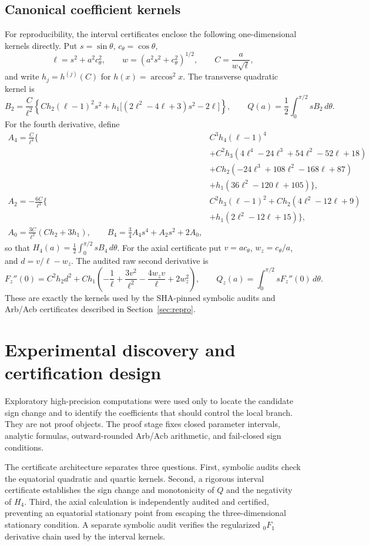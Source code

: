\documentclass[11pt]{article}
\begin{document}
\subsection{Canonical coefficient kernels}
For reproducibility, the interval certificates enclose the following one-dimensional kernels directly. Put $s=\sin\theta$, $c_\theta=\cos\theta$,
\[
\ell=s^2+a^2c_\theta^2,\qquad w=(a^2s^2+c_\theta^2)^{1/2},\qquad C=\frac{a}{w\sqrt\ell},
\]
and write $h_j=h^{(j)}(C)$ for $h(x)=\arccos^2x$. The transverse quadratic kernel is
\[
B_2=\frac{C}{\ell^2}\!\left\{Ch_2(\ell-1)^2s^2+h_1\big[(2\ell^2-4\ell+3)s^2-2\ell\big]\right\},
\qquad Q(a)=\frac12\int_0^{\pi/2}sB_2\,d\theta.
\]
For the fourth derivative, define
\begin{align*}
A_4=\frac{C}{\ell^4}\{&C^3h_4(\ell-1)^4\\
&+C^2h_3(4\ell^4-24\ell^3+54\ell^2-52\ell+18)\\
&+Ch_2(-24\ell^3+108\ell^2-168\ell+87)\\
&+h_1(36\ell^2-120\ell+105)\},\\
A_2=-\frac{6C}{\ell^3}\{&C^2h_3(\ell-1)^2+Ch_2(4\ell^2-12\ell+9)\\
&+h_1(2\ell^2-12\ell+15)\},\\
A_0=\frac{3C}{\ell^2}(Ch_2+3h_1),\qquad
B_4=\frac34A_4s^4+A_2s^2+2A_0,
\end{align*}
so that $H_4(a)=\frac12\int_0^{\pi/2}sB_4\,d\theta$. For the axial certificate put $v=ac_\theta$, $w_z=c_\theta/a$, and $d=v/\ell-w_z$. The audited raw second derivative is
\[
F_z''(0)=C^2h_2d^2+Ch_1\!\left(-\frac1\ell+\frac{3v^2}{\ell^2}-\frac{4w_zv}{\ell}+2w_z^2\right),
\qquad Q_z(a)=\int_0^{\pi/2}sF_z''(0)\,d\theta.
\]
These are exactly the kernels used by the SHA-pinned symbolic audits and Arb/Acb certificates described in Section~\ref{sec:repro}.

\section{Experimental discovery and certification design}
Exploratory high-precision computations were used only to locate the candidate sign change and to identify the coefficients that should control the local branch. They are not proof objects. The proof stage fixes closed parameter intervals, analytic formulas, outward-rounded Arb/Acb arithmetic, and fail-closed sign conditions.

The certificate architecture separates three questions. First, symbolic audits check the equatorial quadratic and quartic kernels. Second, a rigorous interval certificate establishes the sign change and monotonicity of $Q$ and the negativity of $H_4$. Third, the axial calculation is independently audited and certified, preventing an equatorial stationary point from escaping the three-dimensional stationary condition. A separate symbolic audit verifies the regularized ${}_0F_1$ derivative chain used by the interval kernels.
\end{document}
